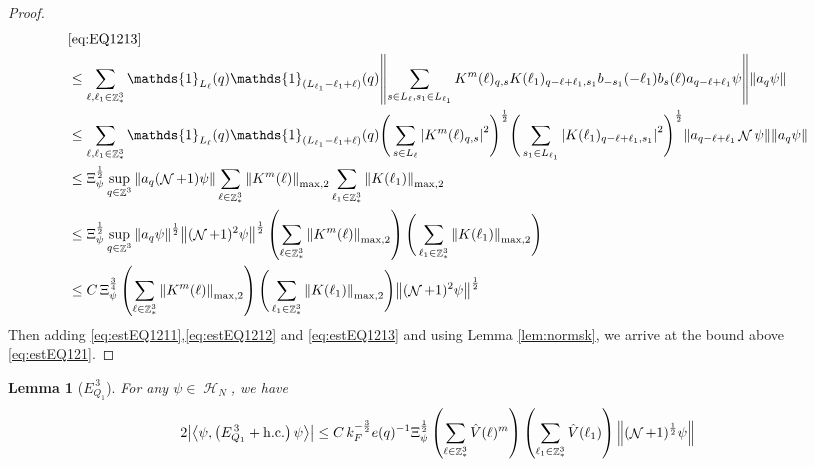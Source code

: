 \documentclass[sn-mathphys, Numbered ,a4paper]{sn-jnl}%
\DeclareMathOperator{\Z}{\mathbb{Z}}
\DeclareMathOperator{\HH}{\mathcal{H}}
\DeclareMathOperator{\NN}{\mathcal{N}}
\newcommand{\half}{\frac{1}{2}}
\newcommand{\eva}[1]{\left\langle #1 \right\rangle}
\theoremstyle{plain}
\newtheorem{lemma}[theorem]{Lemma}
\theoremstyle{definition}
\theoremstyle{remark}
\theoremstyle{plain}
\theoremstyle{definition}
\theoremstyle{remark}
\begin{document}
\begin{proof}
\begin{align}
	&\eqref{eq:EQ1213}\nonumber\\
	&\leq\sum\limits_{\ell, \ell_1\in \Z^3_*} \mathds{1}_{L_{\ell}}(q)  \mathds{1}_{(L_{\ell_1}-\ell_1+\ell)}(q)  \norm{ \sum\limits_{s\in L_{\ell}, s_1 \in L_{\ell_1}} K^m(\ell)_{q,s}K(\ell_1)_{q-\ell+\ell_1,s_1} b_{-s_1}(-\ell_1) b_{s}(\ell) a_{q-\ell+\ell_1}\psi}\norm{ a_{q}\psi }\nonumber\\
	&\leq\sum\limits_{\ell, \ell_1\in \Z^3_*}  \mathds{1}_{L_{\ell}}(q) \mathds{1}_{(L_{\ell_1}-\ell_1+\ell)}(q) \Bigg(\sum\limits_{s \in L_{\ell}} \abs{K^m(\ell)_{q,s}}^2\Bigg)^\half \Bigg(\sum\limits_{s_1 \in L_{\ell_1}} \abs{K(\ell_1)_{q-\ell+\ell_1,s_1}}^2\Bigg)^\half \norm{ a_{q-\ell+\ell_1} \NN\psi} \norm{ a_{q}\psi }\nonumber\\
	&\leq \Xi_{\psi}^\half \sup_{q \in \Z^3}\norm{ a_{q} (\NN+1)\psi}\sum\limits_{\ell \in \Z^3_*} \norm{  K^{m}(\ell)}_{\mathrm{max,2}}  \sum\limits_{\ell_1 \in \Z^3_*} \norm{K(\ell_1)}_{\mathrm{max,2}} \nonumber\\
	&\leq  \Xi_{\psi}^\half  \sup_{q \in \Z^3}\norm{ a_{q} \psi}^\half \norm{ (\NN+1)^2\psi}^\half \left(\sum\limits_{\ell \in \Z^3_*} \norm{K^m(\ell)}_{\mathrm{max,2}}\right)\Bigg(\sum\limits_{\ell_1 \in \Z^3_*} \norm{K(\ell_1)}_{\mathrm{max,2}}\Bigg) \nonumber\\
	&\leq C\, \Xi_{\psi}^{\frac{3}{4}} \left(\sum\limits_{\ell \in \Z^3_*} \norm{K^m(\ell)}_{\mathrm{max,2}}\right)\Bigg(\sum\limits_{\ell_1 \in \Z^3_*} \norm{K(\ell_1)}_{\mathrm{max,2}} \Bigg)  \norm{ (\NN+1)^2\psi}^\half \label{eq:estEQ1213}
\end{align}
Then adding \eqref{eq:estEQ1211},\eqref{eq:estEQ1212} and \eqref{eq:estEQ1213} and using Lemma \ref{lem:normsk}, we arrive at the bound above \eqref{eq:estEQ121}.
\end{proof}
\begin{lemma}[$E_{Q_1}^{\,3}$]\label{lem:EQ112}
For any $\psi \in \HH_N$, we have
\begin{equation}
	2\abs{\eva{\psi,\left(E^{\,3}_{Q_1}+\mathrm{h.c.}\right) \psi }}\nonumber
	\leq C\, k_{F}^{-\frac{3}{2}} e(q)^{-1} \Xi_{\psi}^{\half} \left(\sum\limits_{\ell\in \Z^3_*} \hat{V}(\ell)^m \right) \left(\sum\limits_{\ell_1\in \Z^3_*} \hat{V}(\ell_1) \right) \norm{(\NN+1)^\half \psi } \label{eq:estEQ112}
\end{equation}
\end{lemma}
\end{document}
